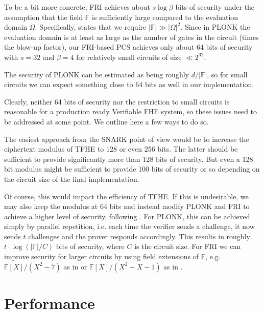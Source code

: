 \documentclass[final]{zamarep}
\newcommand{\field}{\mathbb{F}}
\begin{document}
To be a bit more concrete, FRI achieves about $s \log \beta$ bits of security under the assumption that the field $\field$ is sufficiently large compared to the evaluation domain $\Omega$. Specifically, \cite{cryptoeprint:2023/474} states that we require $\lvert \field \rvert \gg \lvert \Omega \rvert^2$. Since in PLONK the evaluation domain is at least as large as the number of gates in the circuit (times the blow-up factor), our FRI-based PCS achieves only about 64 bits of security with $s = 32$ and $\beta = 4$ for relatively small circuits of size $\ll 2^{32}$. 

The security of PLONK can be estimated as being roughly $d / \lvert \field \rvert$, so for small circuits we can expect something close to $64$ bits as well in our implementation.

Clearly, neither 64 bits of security nor the restriction to small circuits is reasonable for a production ready Verifiable FHE system, so these issues need to be addressed at some point. We outline here a few ways to do so.

The easiest approach from the SNARK point of view would be to increase the ciphertext modulus of TFHE to 128 or even 256 bits. The latter should be sufficient to provide significantly more than 128 bits of security. But even a 128 bit modulus might be sufficient to provide 100 bits of security or so depending on the circuit size of the final implementation.

Of course, this would impact the efficiency of TFHE. If this is undesirable, we may also keep the modulus at 64 bits and instead modify PLONK and FRI to achieve a higher level of security, following \cite{EPRINT:StarkWare21,plonky2}. For PLONK, this can be achieved simply by parallel repetition, i.e. each time the verifier sends a challenge, it now sends $t$ challenges and the prover responds accordingly. This results in roughly $t \cdot \log\left( \lvert \field \rvert / C \right)$ bits of security, where $C$ is the circuit size. For FRI we can improve security for larger circuits by using field extensions of $\field$, e.g.\ $\field[X]/(X^2 - 7)$ as in \cite{plonky2} or $\field[X]/(X^2 - X - 1)$ as in \cite{EPRINT:StarkWare21}.

\section{Performance}
\label{sec:perf}
\end{document}
